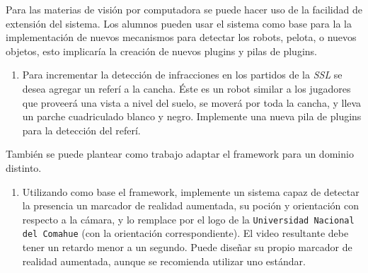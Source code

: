 Para las materias de visión por computadora se puede hacer uso de la facilidad
de extensión del sistema. Los alumnos pueden usar el sistema como base para la
la implementación de nuevos mecanismos para detectar los robots, pelota, o
nuevos objetos, esto implicaría la creación de nuevos plugins y pilas de
plugins.

\begin{enumerate}

	\item{Para incrementar la detección de infracciones en los partidos de
		la \emph{SSL} se desea agregar un referí a la cancha. Éste es un
		robot similar a los jugadores que proveerá una vista a nivel del
		suelo, se moverá por toda la cancha, y lleva un parche
		cuadriculado blanco y negro. Implemente una nueva pila de
		plugins para la detección del referí.}

\end{enumerate}

También se puede plantear como trabajo adaptar el framework para un dominio
distinto.

\begin{enumerate}

	\item{Utilizando como base el framework, implemente un sistema capaz de
		detectar la presencia un marcador de realidad aumentada, su
		poción y orientación con respecto a la cámara, y lo remplace por
		el logo de la \texttt{Universidad Nacional del Comahue} (con la
		orientación correspondiente). El video resultante debe tener un
		retardo menor a un segundo. Puede diseñar su propio marcador de
		realidad aumentada, aunque se recomienda utilizar uno estándar.}

\end{enumerate}
